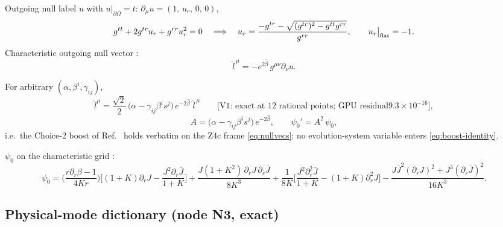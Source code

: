 Outgoing null label $u$ with $u|_{\partial\Omega}=t$:
$\partial_\mu u = (1,\,u_r,\,0,\,0)$,
\begin{equation}
g^{tt} + 2g^{tr}u_r + g^{rr}u_r^2 = 0
\quad\Longrightarrow\quad
u_r = \frac{-g^{tr}-\sqrt{(g^{tr})^2 - g^{tt}g^{rr}}}{g^{rr}},
\qquad u_r\big|_{\rm flat} = -1 .
\label{eq:uroot}
\end{equation}
Characteristic outgoing null vector \cite{Moxon:2020gha,Ma:2023qjn}:
\begin{equation}
\hat l^{\,\mu} = -e^{2\hat\beta}\,g^{\mu\nu}\partial_\nu u .
\label{eq:lhat}
\end{equation}
\begin{nfblock}
For arbitrary $(\alpha,\beta^i,\gamma_{ij})$,
\begin{equation}
\mathring{l}^{\mu}
 = \frac{\sqrt{2}}{2}\,
 \big(\alpha-\gamma_{ij}\beta^i s^j\big)\,e^{-2\hat\beta}\;
 \hat l^{\,\mu}
\qquad\text{[V1: exact at 12 rational points; GPU residual
$9.3\times10^{-16}$]},
\label{eq:boost-identity}
\end{equation}
\begin{equation}
A = \big(\alpha-\gamma_{ij}\beta^i s^j\big)\,e^{-2\hat\beta},
\qquad
\psi_0' = A^2\,\psi_0 ,
\label{eq:boost}
\end{equation}
i.e.\ the Choice-2 boost of Ref.~\cite{Ma:2023qjn} holds verbatim on the Z4c
frame \eqref{eq:nullvecs}: no evolution-system variable enters
\eqref{eq:boost-identity}.
\end{nfblock}
$\psi_0$ on the characteristic grid \cite{Moxon:2020gha,Ma:2023qjn}:
\begin{equation}
\psi_0=\Big(\frac{r\partial_{r}\beta-1}{4Kr}\Big)
\Big[(1{+}K)\partial_{r}J-\frac{J^2\partial_{r}\bar{J}}{1{+}K}\Big]
+\frac{J(1{+}K^2)\,\partial_{r}J\,\partial_{r}\bar{J}}{8K^3}
+\frac{1}{8K}\Big[\frac{J^2\partial^2_{r}\bar{J}}{1{+}K}
 -(1{+}K)\partial_{r}^2J\Big]
-\frac{J\bar{J}^2(\partial_{r}J)^2+J^3(\partial_{r}\bar{J})^2}{16K^3}.
\label{eq:psi0cce}
\end{equation}

\subsection{Physical-mode dictionary (node N3, exact)}
\label{sec:n3}

